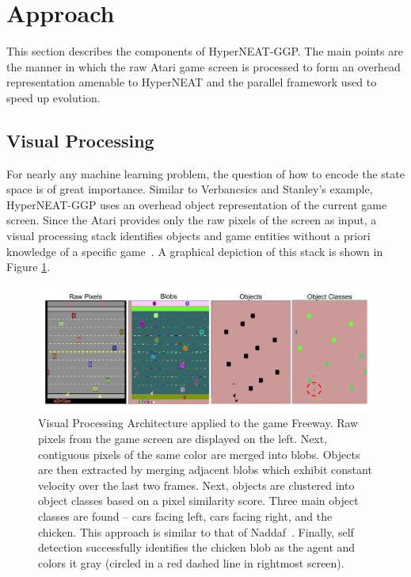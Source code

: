 \documentclass{acm_proc_article-sp}
\begin{document}
\section{Approach}
\label{sec:approach}
This section describes the components of HyperNEAT-GGP. The main points are the manner in which the raw Atari game screen is processed to form an overhead representation amenable to HyperNEAT and the parallel framework used to speed up evolution.

\subsection{Visual Processing}
For nearly any machine learning problem, the question of how to encode the state space is of great importance. Similar to Verbancsics and Stanley's example, HyperNEAT-GGP uses an overhead object representation of the current game screen. Since the Atari provides only the raw pixels of the screen as input, a visual processing stack identifies objects and game entities without a priori knowledge of a specific game~\cite{naddaf10}. A graphical depiction of this stack is shown in Figure \ref{fig:visproc}.

\begin{figure}[htp]
\begin{center}
\includegraphics[width=\textwidth]{figures/AtariArch}
\end{center}
\caption{Visual Processing Architecture applied to the game Freeway. Raw pixels from the game screen are displayed on the left. Next, contiguous pixels of the same color are merged into blobs. Objects are then extracted by merging adjacent blobs which exhibit constant velocity over the last two frames. Next, objects are clustered into object classes based on a pixel similarity score. Three main object classes are found -- cars facing left, cars facing right, and the chicken. This approach is similar to that of Naddaf~\cite{naddaf10}. Finally, self detection successfully identifies the chicken blob as the agent and colors it gray (circled in a red dashed line in rightmost screen).}
\label{fig:visproc}
\end{figure}
\end{document}
